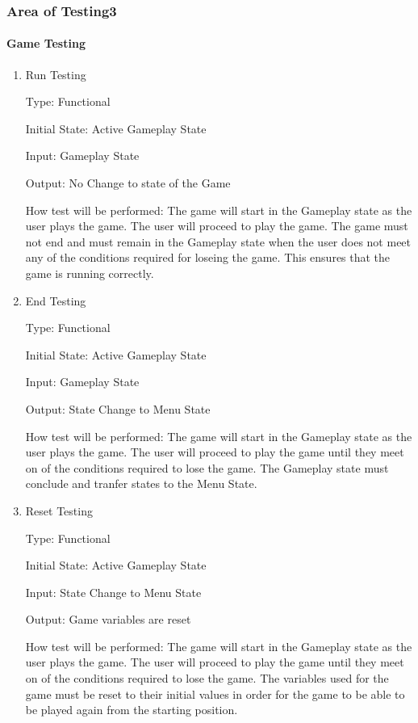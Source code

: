 \documentclass[12pt, titlepage]{article}
\begin{document}
\subsubsection{Area of Testing3}
		
\paragraph{Game Testing}

\begin{enumerate}

\item{Run Testing\\}

Type: Functional
					
Initial State: Active Gameplay State
					
Input: Gameplay State
					
Output: No Change to state of the Game
					
How test will be performed: The game will start in the Gameplay state as the user plays the game. The user will proceed to play the game. The game must not end and must remain in the Gameplay state when the user does not meet any of the conditions required for loseing the game. This ensures that the game is running correctly. 
					
					
\item{End Testing\\}

Type: Functional
					
Initial State: Active Gameplay State
					
Input: Gameplay State
					
Output: State Change to Menu State
					
How test will be performed: The game will start in the Gameplay state as the user plays the game. The user will proceed to play the game until they meet on of the conditions required to lose the game. The Gameplay state must conclude and tranfer states to the Menu State. 

\item{Reset Testing\\}

Type: Functional
					
Initial State: Active Gameplay State
					
Input: State Change to Menu State
					
Output: Game variables are reset
					
How test will be performed: The game will start in the Gameplay state as the user plays the game. The user will proceed to play the game until they meet on of the conditions required to lose the game. The variables used for the game must be reset to their initial values in order for the game to be able to be played again from the starting position.


\end{enumerate}
\end{document}
